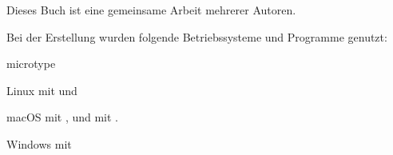 

%


\listfiles


\frontmatter



\tableofcontents
\mainmatter




















\printbibliography




\vfill
{}

Dieses Buch ist eine gemeinsame Arbeit mehrerer Autoren.

Bei der Erstellung wurden folgende Betriebssysteme und Programme genutzt:

\begin{labeling}{microtype}
  \item[Linux] mit  und 
  \item[macOS] mit ,  und 
    mit .
  \item[Windows] mit 
\end{labeling}

